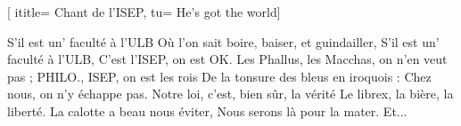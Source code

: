 [
ititle= {Chant de l'ISEP},
tu= {He’s got the world}]

\beginverse
S'il est un' faculté à l'ULB
Où l'on sait boire, baiser, et guindailler,
S'il est un' faculté à l'ULB,
C'est l'ISEP, on est OK.
Les Phallus, les Macchas, on n'en veut pas ;
PHILO., ISEP, on est les rois
De la tonsure des bleus en iroquois :
Chez nous, on n'y échappe pas.
Notre loi, c'est, bien sûr, la vérité
Le librex, la bière, la liberté.
La calotte a beau nous éviter,
Nous serons là pour la mater.
Et...
\endverse

\endsong